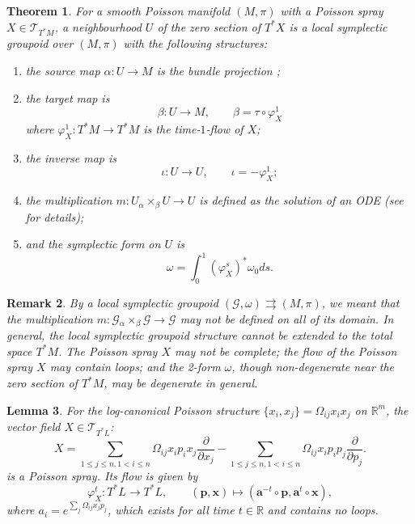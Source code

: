 \documentclass{amsart}
\newtheorem{theorem}{Theorem}[section]
\newtheorem{lemma}[theorem]{Lemma}
\newtheorem{remark}[theorem]{Remark}
\numberwithin{equation}{section}
\newcommand{\bfa}{\mathbf{a}}
\newcommand{\bfp}{\mathbf{p}}
\newcommand{\bfx}{\mathbf{x}}
\newcommand{\cG}{\mathcal{G}}
\newcommand{\cT}{\mathcal{T}}
\newcommand{\RR}{\mathbb{R}}
\newcommand{\rra}{\rightrightarrows}
\begin{document}
\begin{theorem} \cite{MR2900786, CMS17} \label{thm:poissp}
For a smooth Poisson manifold $(M, \pi)$ with a Poisson spray $X \in \cT_{T^*M}$, a neighbourhood $U$ of the zero section of $T^*X$ is a local symplectic groupoid over $(M, \pi)$ with the following structures:
	\begin{enumerate}
		\item the source map $\alpha: U \to M$ is the bundle projection ;
		\item the target map is
			\[
				\beta: U \to M, \qquad \beta = \tau \circ \varphi_X^1
			\]
		where $\varphi_X^1: T^*M \to T^*M$ is the time-$1$-flow of $X$;
		\item the inverse map is
			\[
				\iota: U \to U, \qquad \iota = -\varphi_X^1;
			\]
		\item the multiplication $m: U {_\alpha \times_\beta} U \to U$ is defined as the solution of an ODE (see \cite{CMS17} for details);
		\item  and the symplectic form on $U$ is
			\[
				\omega = \int_{0}^{1} (\varphi_X^s)^*\omega_0 ds.
			\]
	\end{enumerate}
\end{theorem}

\begin{remark}
	By a local symplectic groupoid $(\cG, \omega) \rra (M, \pi)$, we meant that the multiplication $m: \cG {_\alpha \times_\beta} \cG \to \cG$ may not be defined on all of its domain. In general, the local symplectic groupoid structure cannot be extended to the total space $T^*M$. The Poisson spray $X$ may not be complete; the flow of the Poisson spray $X$ may contain loops; and the 2-form $\omega$, though non-degenerate near the zero section of $T^*M$, may be degenerate in general.
\end{remark}



\begin{lemma}
For the log-canonical Poisson structure $\{x_i, x_j\} = \Omega_{ij} x_i x_j$ on $\RR^m$,
the vector field $X \in \cT_{T^*L}$:
\begin{equation} \label{eq: PoisSp}
		X = \sum_{1 \leq j \leq n, 1 < i \leq n}\Omega_{ij}x_i p_i x_j\frac{\partial}{\partial x_j} - \sum_{1 \leq j \leq n, 1 < i \leq n}\Omega_{ij}x_ip_i p_j\frac{\partial}{\partial p_j}.
\end{equation}
is a Poisson spray. Its flow is given by
	\[
		\varphi_X^t: T^*L \to T^*L, \qquad (\bfp, \bfx) \mapsto (\bfa^{-t} \circ \bfp, \bfa^t \circ \bfx),
	\]
where $a_i = e^{\sum_j \Omega_{ij} x_jp_j}$, which exists for all time $t \in \RR$ and contains no loops.
\end{lemma}
\end{document}

